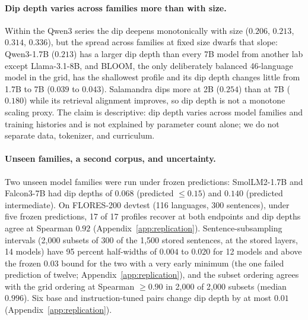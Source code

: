 \documentclass{article} %
\begin{document}
\paragraph{Dip depth varies across families more than with size.} Within the Qwen3 series the
dip deepens monotonically with size ($0.206$, $0.213$, $0.314$, $0.336$), but
the spread across families at fixed size dwarfs that slope: Qwen3-1.7B
($0.213$) has a larger dip depth than every 7B model from another lab except Llama-3.1-8B, and BLOOM, the only deliberately balanced 46-language model in the grid, has the shallowest profile and its dip depth changes little from 1.7B to 7B ($0.039$ to $0.043$). Salamandra dips more at 2B ($0.254$) than at 7B ($0.180$) while its retrieval alignment improves, so dip depth is not a monotone scaling proxy.
The claim is descriptive: dip depth varies across model families and training histories and is not explained by parameter count alone; we do not separate data, tokenizer, and curriculum.

\paragraph{Unseen families, a second corpus, and uncertainty.} Two unseen model families were run under frozen predictions: SmolLM2-1.7B and Falcon3-7B had dip depths of $0.068$ (predicted $\le 0.15$) and $0.140$ (predicted intermediate). On FLORES-200 devtest \citep{nllb2022} (116 languages, 300 sentences), under five frozen predictions, 17 of 17 profiles recover at both endpoints and dip depths agree at Spearman $0.92$ (Appendix~\ref{app:replication}). Sentence-subsampling intervals (2,000 subsets of 300 of the 1,500 stored sentences, at the stored layers, 14 models) have 95 percent half-widths of $0.004$ to $0.020$ for 12 models and above the frozen $0.03$ bound for the two with a very early minimum (the one failed prediction of twelve; Appendix~\ref{app:replication}), and the subset ordering agrees with the grid ordering at Spearman $\geq 0.90$ in 2,000 of 2,000 subsets (median $0.996$). Six base and instruction-tuned pairs change dip depth by at most $0.01$ (Appendix~\ref{app:replication}).
\end{document}
